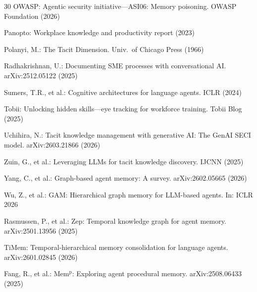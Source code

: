 \documentclass[]{ceurart}
\begin{document}
\begin{thebibliography}{30}
 OWASP: Agentic security initiative---ASI06: Memory
  poisoning. OWASP Foundation (2026)

 Panopto: Workplace knowledge and productivity
  report (2023)

 Polanyi, M.: The Tacit Dimension. Univ.\ of
  Chicago Press (1966)

 Radhakrishnan, U.: Documenting SME processes
  with conversational AI. arXiv:2512.05122 (2025)

 Sumers, T.R., et al.: Cognitive architectures
  for language agents. ICLR (2024)

 Tobii: Unlocking hidden skills---eye tracking for
  workforce training. Tobii Blog (2025)

 Uchihira, N.: Tacit knowledge management with
  generative AI: The GenAI SECI model. arXiv:2603.21866 (2026)

 Zuin, G., et al.: Leveraging LLMs for tacit
  knowledge discovery. IJCNN (2025)

 Yang, C., et al.: Graph-based agent
  memory: A survey. arXiv:2602.05665 (2026)

 Wu, Z., et al.: GAM: Hierarchical graph memory for
  LLM-based agents. In: ICLR 2026

 Rasmussen, P., et al.: Zep: Temporal knowledge
  graph for agent memory. arXiv:2501.13956 (2025)

 TiMem: Temporal-hierarchical memory consolidation
  for language agents. arXiv:2601.02845 (2026)

 Fang, R., et al.: Mem$^{\mathrm{p}}$: Exploring
  agent procedural memory. arXiv:2508.06433 (2025)

\end{thebibliography}
\end{document}
